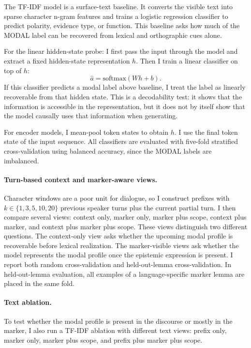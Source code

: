 \documentclass{article}
\begin{document}
The TF-IDF model is a surface-text baseline. It converts the visible text into sparse character n-gram features and trains a logistic regression classifier to predict polarity, evidence type, or function. This baseline asks how much of the MODAL label can be recovered from lexical and orthographic cues alone.

For the linear hidden-state probe: I first pass the input through the model and extract a fixed hidden-state representation $h$. Then I train a linear classifier on top of $h$:
\[
    \hat a = \mathrm{softmax}(Wh + b).
\]
If this classifier predicts a modal label above baseline, I treat the label as linearly recoverable from that hidden state. This is a decodability test: it shows that the information is accessible in the representation, but it does not by itself show that the model causally uses that information when generating.

For encoder models, I mean-pool token states to obtain $h$. I use the final token state of the input sequence. All classifiers are evaluated with five-fold stratified cross-validation using balanced accuracy, since the MODAL labels are imbalanced.

\paragraph{Turn-based context and marker-aware views.}
Character windows are a poor unit for dialogue, so I construct prefixes with $k\in\{1,3,5,10,20\}$ previous speaker turns plus the current partial turn. I then compare several views: context only, marker only, marker plus scope, context plus marker, and context plus marker plus scope. These views distinguish two different questions. The context-only view asks whether the upcoming modal profile is recoverable before lexical realization. The marker-visible views ask whether the model represents the modal profile once the epistemic expression is present. I report both random cross-validation and held-out-lemma cross-validation. In held-out-lemma evaluation, all examples of a language-specific marker lemma are placed in the same fold. 

\paragraph{Text ablation.}
To test whether the modal profile is present in the discourse or mostly in the marker, I also run a TF-IDF ablation with different text views: prefix only, marker only, marker plus scope, and prefix plus marker plus scope.
\end{document}
